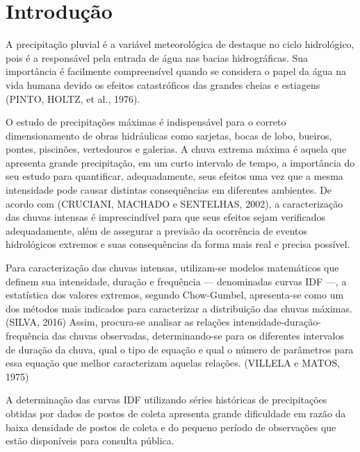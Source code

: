 \textual

\chapter*[Introdução]{Introdução}

A precipitação pluvial é a variável meteorológica de destaque no ciclo hidrológico, pois é a responsável pela entrada de água nas bacias hidrográficas. Sua importância é facilmente compreensível quando se considera o papel da água na vida humana devido os efeitos catastróficos das grandes cheias e estiagens (PINTO, HOLTZ, et al., 1976).

O estudo de precipitações máximas é indispensável para o correto dimensionamento de obras hidráulicas como sarjetas, bocas de lobo, bueiros, pontes, piscinões, vertedouros e galerias. A chuva extrema máxima é aquela que apresenta grande precipitação, em um curto intervalo de tempo, a importância do seu estudo para quantificar, adequadamente, seus efeitos uma vez que a mesma intensidade pode causar distintas consequências em diferentes ambientes.  De acordo com (CRUCIANI, MACHADO e SENTELHAS, 2002), a caracterização das chuvas intensas é imprescindível para que seus efeitos sejam verificados adequadamente, além de assegurar a previsão da ocorrência de eventos hidrológicos extremos e suas consequências da forma mais real e precisa possível.

Para caracterização das chuvas intensas, utilizam-se modelos matemáticos que definem sua intensidade, duração e frequência — denominadas curvas IDF —, a estatística dos valores extremos, segundo Chow-Gumbel, apresenta-se como um dos métodos mais indicados para caracterizar a distribuição das chuvas máximas. (SILVA, 2016) Assim, procura-se analisar as relações intensidade-duração-frequência das chuvas observadas, determinando-se para os diferentes intervalos de duração da chuva, qual o tipo de equação e qual o número de parâmetros para essa equação que melhor caracterizam aquelas relações.  (VILLELA e MATOS, 1975)

A determinação das curvas IDF utilizando séries históricas de precipitações obtidas por dados de postos de coleta apresenta grande dificuldade em razão da baixa densidade de postos de coleta e do pequeno período de observações que estão disponíveis para consulta pública. 

